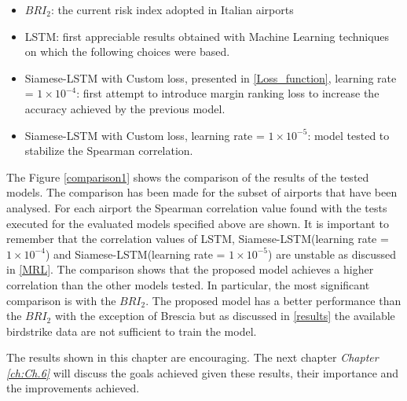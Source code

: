 \begin{itemize}
    \item $BRI_2$: the current risk index adopted in Italian airports
    \item LSTM: first appreciable results obtained with Machine Learning techniques on which the following choices were based.
    \item Siamese-LSTM with Custom loss, presented in \ref{Loss_function}, learning rate = $1\times10^{-4}$: first attempt to introduce margin ranking loss to increase the accuracy achieved by the previous model.
    \item Siamese-LSTM with Custom loss, learning rate = $1\times10^{-5}$: model tested to stabilize the Spearman correlation.
\end{itemize}

The Figure \ref{comparison1} shows the comparison of the results of the tested models.
The comparison has been made for the subset of airports that have been analysed. For each airport the Spearman correlation value found with the tests executed for the evaluated models specified above are shown.
It is important to remember that the correlation values of LSTM, Siamese-LSTM(learning rate = $1\times10^{-4}$) and Siamese-LSTM(learning rate = $1\times10^{-5}$) are unstable as discussed in \ref{MRL}.
The comparison shows that the proposed model achieves a higher correlation than the other models tested.
In particular, the most significant comparison is with the $BRI_2$. The proposed model has a better performance than the $BRI_2$ with the exception of Brescia but as discussed in \ref{results} the available birdstrike data are not sufficient to train the model.

The results shown in this chapter are encouraging. The next chapter \textit{Chapter \ref{ch:Ch.6}} will discuss the goals achieved given these results, their importance and the improvements achieved.


